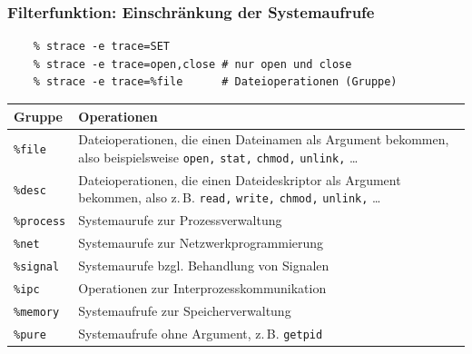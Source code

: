 \begin{frame}[fragile]
  \frametitle{Filterfunktion: Einschränkung der Systemaufrufe}

  \begin{lstlisting}
    % strace -e trace=SET
    % strace -e trace=open,close # nur open und close
    % strace -e trace=%file      # Dateioperationen (Gruppe)
  \end{lstlisting}

  \begin{center}
    \begin{tabular}{|p{2cm}p{8.5cm}|}
      \hline
      \textbf{Gruppe} & \textbf{Operationen} \\
      \hline
      \texttt{\%file}          & Dateioperationen, die einen Dateinamen als Argument
                                bekommen, also beispielsweise \texttt{open,} \texttt{stat,}
                                \texttt{chmod,} \texttt{unlink,} … \\
      \texttt{\%desc}          & Dateioperationen, die einen Dateideskriptor als \newline
                                 Argument bekommen, also z.\,B. \texttt{read,} \texttt{write,}
                                \texttt{chmod,} \texttt{unlink,} … \\
      \texttt{\%process}       & Systemaurufe zur Prozessverwaltung \\
      \texttt{\%net}           & Systemaurufe zur Netzwerkprogrammierung \\
      \texttt{\%signal}        & Systemaurufe bzgl. Behandlung von Signalen \\
      \texttt{\%ipc}           & Operationen zur Interprozesskommunikation \\
      \texttt{\%memory}        & Systemaufrufe zur Speicherverwaltung \\
      \texttt{\%pure}          & Systemaufrufe ohne Argument, z.\,B. \texttt{getpid} \\
      \hline
    \end{tabular}
  \end{center}

\end{frame}

